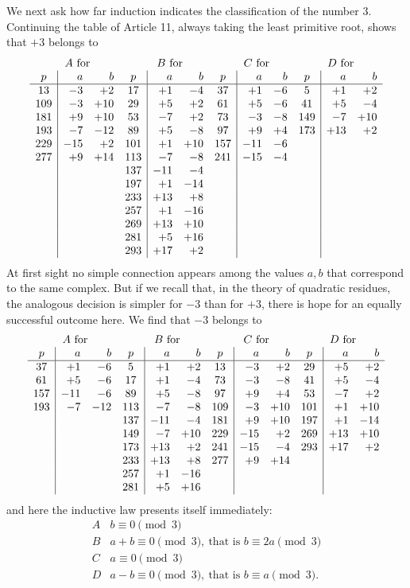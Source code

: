 \documentclass[12pt]{article}
\begin{document}
We next ask how far induction indicates the classification of the number $3$. Continuing the table of Article 11, always taking the least primitive root, shows that $+3$ belongs to
\[
\begin{array}{c|rr@{\quad}c|rr@{\quad}c|rr@{\quad}c|rr}
\multicolumn{3}{c}{A\ \text{for}}&
\multicolumn{3}{c}{B\ \text{for}}&
\multicolumn{3}{c}{C\ \text{for}}&
\multicolumn{3}{c}{D\ \text{for}}\\
p&a&b&p&a&b&p&a&b&p&a&b\\\hline
13&-3&+2&17&+1&-4&37&+1&-6&5&+1&+2\\
109&-3&+10&29&+5&+2&61&+5&-6&41&+5&-4\\
181&+9&+10&53&-7&+2&73&-3&-8&149&-7&+10\\
193&-7&-12&89&+5&-8&97&+9&+4&173&+13&+2\\
229&-15&+2&101&+1&+10&157&-11&-6&&&\\
277&+9&+14&113&-7&-8&241&-15&-4&&&\\
&&&137&-11&-4&&&&&&\\
&&&197&+1&-14&&&&&&\\
&&&233&+13&+8&&&&&&\\
&&&257&+1&-16&&&&&&\\
&&&269&+13&+10&&&&&&\\
&&&281&+5&+16&&&&&&\\
&&&293&+17&+2&&&&&&
\end{array}
\]
At first sight no simple connection appears among the values $a,b$ that correspond to the same complex. But if we recall that, in the theory of quadratic residues, the analogous decision is simpler for $-3$ than for $+3$, there is hope for an equally successful outcome here. We find that $-3$ belongs to
\[
\begin{array}{c|rr@{\quad}c|rr@{\quad}c|rr@{\quad}c|rr}
\multicolumn{3}{c}{A\ \text{for}}&
\multicolumn{3}{c}{B\ \text{for}}&
\multicolumn{3}{c}{C\ \text{for}}&
\multicolumn{3}{c}{D\ \text{for}}\\
p&a&b&p&a&b&p&a&b&p&a&b\\\hline
37&+1&-6&5&+1&+2&13&-3&+2&29&+5&+2\\
61&+5&-6&17&+1&-4&73&-3&-8&41&+5&-4\\
157&-11&-6&89&+5&-8&97&+9&+4&53&-7&+2\\
193&-7&-12&113&-7&-8&109&-3&+10&101&+1&+10\\
&&&137&-11&-4&181&+9&+10&197&+1&-14\\
&&&149&-7&+10&229&-15&+2&269&+13&+10\\
&&&173&+13&+2&241&-15&-4&293&+17&+2\\
&&&233&+13&+8&277&+9&+14&&&\\
&&&257&+1&-16&&&&&&\\
&&&281&+5&+16&&&&&&
\end{array}
\]
and here the inductive law presents itself immediately:
\[
\begin{array}{l|l}
A& b\equiv0\pmod3\\
B& a+b\equiv0\pmod3,\ \text{that is } b\equiv2a\pmod3\\
C& a\equiv0\pmod3\\
D& a-b\equiv0\pmod3,\ \text{that is } b\equiv a\pmod3.
\end{array}
\]
\end{document}
